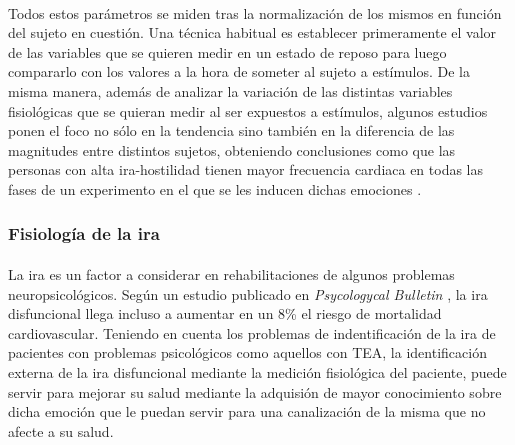 \paragraph{}
Todos estos parámetros se miden tras la normalización de los mismos en función del sujeto en cuestión. Una técnica habitual es establecer primeramente el valor de las variables que se quieren medir en un estado de reposo para luego compararlo con los valores a la hora de someter al sujeto a estímulos. De la misma manera, además de analizar la variación de las distintas variables fisiológicas que se quieran medir al ser expuestos a estímulos, algunos estudios ponen el foco no sólo en la tendencia sino también en la diferencia de las magnitudes entre distintos sujetos, obteniendo conclusiones como que las personas con alta ira-hostilidad tienen mayor frecuencia cardiaca en todas las fases de un experimento en el que se les inducen dichas emociones \citep{breva2000ira}.


\subsubsection{Fisiología de la ira}
\label{subsubsec:fisioIra}

\paragraph{}
La ira es un factor a considerar en rehabilitaciones de algunos problemas neuropsicológicos. Según un estudio publicado en \textit{Psycologycal Bulletin} \citep{millar1996meta}, la ira disfuncional llega incluso a aumentar en un 8\% el riesgo de mortalidad cardiovascular. Teniendo en cuenta los problemas de indentificación de la ira de pacientes con problemas psicológicos como aquellos con TEA, la identificación externa de la ira disfuncional mediante la medición fisiológica del paciente, puede servir para mejorar su salud mediante la adquisión de mayor conocimiento sobre dicha emoción que le puedan servir para una canalización de la misma que no afecte a su salud.

